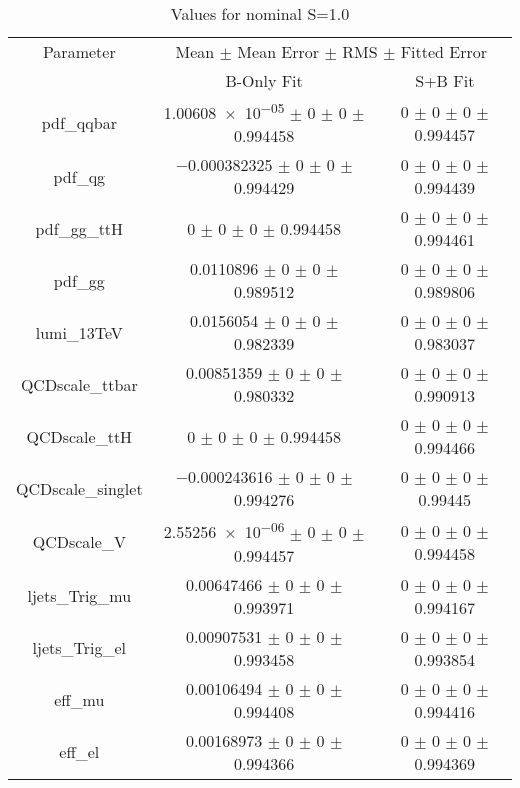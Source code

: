 \begin{table}
\centering
\caption{Values for nominal S=1.0}
\begin{tabular}{ccc}
\toprule
Parameter 	& \multicolumn{2}{c}{Mean $\pm$ Mean Error $\pm$ RMS $\pm$ Fitted Error}\\
 	& B-Only Fit & S+B Fit\\
\midrule
pdf\_qqbar 	& \num{1.00608e-05} $\pm$ \num{0} $\pm$ \num{0} $\pm$ \num{0.994458} 	& \num{0} $\pm$ \num{0} $\pm$ \num{0} $\pm$ \num{0.994457}\\
pdf\_qg 	& \num{-0.000382325} $\pm$ \num{0} $\pm$ \num{0} $\pm$ \num{0.994429} 	& \num{0} $\pm$ \num{0} $\pm$ \num{0} $\pm$ \num{0.994439}\\
pdf\_gg\_ttH 	& \num{0} $\pm$ \num{0} $\pm$ \num{0} $\pm$ \num{0.994458} 	& \num{0} $\pm$ \num{0} $\pm$ \num{0} $\pm$ \num{0.994461}\\
pdf\_gg 	& \num{0.0110896} $\pm$ \num{0} $\pm$ \num{0} $\pm$ \num{0.989512} 	& \num{0} $\pm$ \num{0} $\pm$ \num{0} $\pm$ \num{0.989806}\\
lumi\_13TeV 	& \num{0.0156054} $\pm$ \num{0} $\pm$ \num{0} $\pm$ \num{0.982339} 	& \num{0} $\pm$ \num{0} $\pm$ \num{0} $\pm$ \num{0.983037}\\
QCDscale\_ttbar 	& \num{0.00851359} $\pm$ \num{0} $\pm$ \num{0} $\pm$ \num{0.980332} 	& \num{0} $\pm$ \num{0} $\pm$ \num{0} $\pm$ \num{0.990913}\\
QCDscale\_ttH 	& \num{0} $\pm$ \num{0} $\pm$ \num{0} $\pm$ \num{0.994458} 	& \num{0} $\pm$ \num{0} $\pm$ \num{0} $\pm$ \num{0.994466}\\
QCDscale\_singlet 	& \num{-0.000243616} $\pm$ \num{0} $\pm$ \num{0} $\pm$ \num{0.994276} 	& \num{0} $\pm$ \num{0} $\pm$ \num{0} $\pm$ \num{0.99445}\\
QCDscale\_V 	& \num{2.55256e-06} $\pm$ \num{0} $\pm$ \num{0} $\pm$ \num{0.994457} 	& \num{0} $\pm$ \num{0} $\pm$ \num{0} $\pm$ \num{0.994458}\\
ljets\_Trig\_mu 	& \num{0.00647466} $\pm$ \num{0} $\pm$ \num{0} $\pm$ \num{0.993971} 	& \num{0} $\pm$ \num{0} $\pm$ \num{0} $\pm$ \num{0.994167}\\
ljets\_Trig\_el 	& \num{0.00907531} $\pm$ \num{0} $\pm$ \num{0} $\pm$ \num{0.993458} 	& \num{0} $\pm$ \num{0} $\pm$ \num{0} $\pm$ \num{0.993854}\\
eff\_mu 	& \num{0.00106494} $\pm$ \num{0} $\pm$ \num{0} $\pm$ \num{0.994408} 	& \num{0} $\pm$ \num{0} $\pm$ \num{0} $\pm$ \num{0.994416}\\
eff\_el 	& \num{0.00168973} $\pm$ \num{0} $\pm$ \num{0} $\pm$ \num{0.994366} 	& \num{0} $\pm$ \num{0} $\pm$ \num{0} $\pm$ \num{0.994369}\\

\end{tabular}
\end{table}
